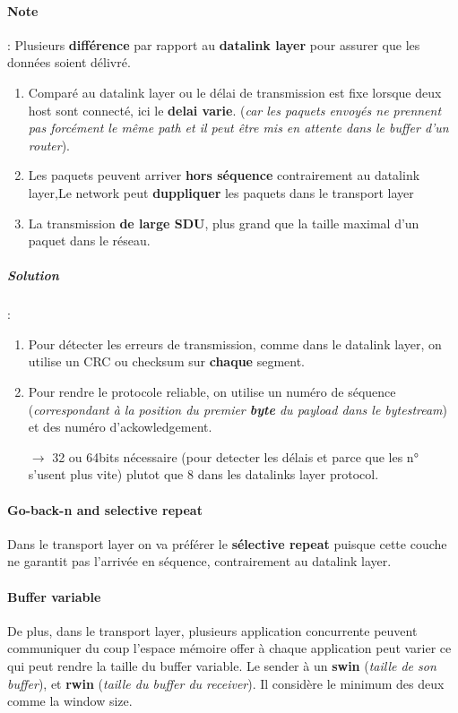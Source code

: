 \paragraph{Note} : Plusieurs \textbf{différence} par rapport au \textbf{datalink layer}
pour assurer que les données soient délivré.

\begin{enumerate}
    \item Comparé au datalink  layer ou le délai de transmission est fixe
        lorsque deux host  sont connecté, ici le \textbf{delai varie}. (\textit{car les
paquets envoyés  ne prennent pas  forcément le  même path et  il peut
être mis en attente dans le buffer d'un router}).
    \item Les paquets peuvent arriver \textbf{hors séquence} contrairement au datalink layer,Le network peut \textbf{duppliquer} les paquets dans le transport layer
    \item La transmission \textbf{de large SDU}, plus grand que la taille maximal d'un paquet dans le réseau.
\end{enumerate}

\subparagraph{Solution} :
\begin{enumerate}
    \item Pour détecter les erreurs de transmission, comme dans le datalink layer, on utilise un
    CRC ou checksum sur \textbf{chaque} segment.
    \item Pour rendre le protocole reliable, on utilise un numéro de séquence 
        (\textit{correspondant à la position du premier \textbf{byte} du payload dans
        le bytestream}) et des numéro d'ackowledgement. 

        $\to$ 32 ou 64bits nécessaire (pour detecter les délais et parce que les n° s'usent plus vite) plutot que 
        8 dans les datalinks layer protocol.
\end{enumerate}

\paragraph{Go-back-n and selective repeat}
Dans le transport layer on va préférer le \textbf{sélective repeat} puisque cette couche
ne garantit pas l'arrivée en séquence, contrairement au datalink layer.

\paragraph{Buffer variable}
De plus, dans le transport layer, plusieurs application concurrente peuvent communiquer
du coup l'espace mémoire offer à chaque application peut varier ce qui peut rendre la
taille du buffer variable.
Le sender à un \textbf{swin} (\textit{taille de son buffer}), et \textbf{rwin} (\textit{taille du buffer du receiver}). Il considère le minimum des deux comme la window size.

